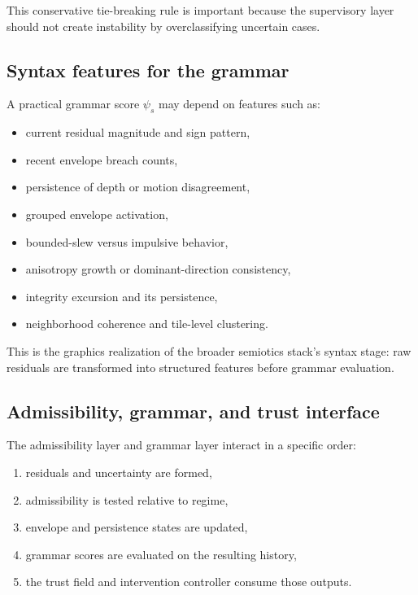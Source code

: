 \documentclass[11pt]{article}
\theoremstyle{definition}
\theoremstyle{plain}
\begin{document}
This conservative tie-breaking rule is important because the supervisory layer should not create instability by overclassifying uncertain cases.


\subsection{Syntax features for the grammar}

A practical grammar score $\psi_s$ may depend on features such as:
\begin{itemize}[leftmargin=1.5em]
    \item current residual magnitude and sign pattern,
    \item recent envelope breach counts,
    \item persistence of depth or motion disagreement,
    \item grouped envelope activation,
    \item bounded-slew versus impulsive behavior,
    \item anisotropy growth or dominant-direction consistency,
    \item integrity excursion and its persistence,
    \item neighborhood coherence and tile-level clustering.
\end{itemize}

This is the graphics realization of the broader semiotics stack’s syntax stage: raw residuals are transformed into structured features before grammar evaluation.


\subsection{Admissibility, grammar, and trust interface}

The admissibility layer and grammar layer interact in a specific order:

\begin{enumerate}[leftmargin=1.5em]
    \item residuals and uncertainty are formed,
    \item admissibility is tested relative to regime,
    \item envelope and persistence states are updated,
    \item grammar scores are evaluated on the resulting history,
    \item the trust field and intervention controller consume those outputs.
\end{enumerate}
\end{document}
